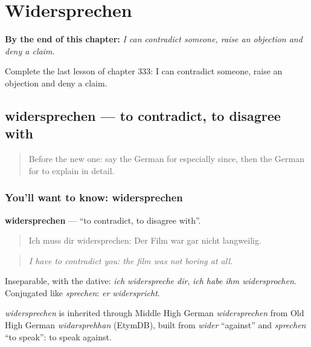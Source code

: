 
\chapter{Widersprechen}
\label{ch:ge-widersprechen}

\begin{chapteropening}
\textbf{By the end of this chapter:} \emph{I can contradict someone, raise an objection and deny a claim.}

Complete the last lesson of chapter 333: I can contradict someone, raise an objection and deny a claim.
\end{chapteropening}

\section[widersprechen]{widersprechen — to contradict, to disagree with}

\label{lesson:GE-C333-widersprechen}



\begin{quote}
Before the new one: say the German for especially since, then the German for to explain in detail.
\end{quote}

\subsection*{You'll want to know: widersprechen}
\textbf{widersprechen} — \textquotedblleft{}to contradict, to disagree with\textquotedblright{}.

\begin{quote}
Ich muss dir widersprechen: Der Film war gar nicht langweilig.
\end{quote}

\begin{quote}
\emph{I have to contradict you: the film was not boring at all.}
\end{quote}

Inseparable, with the dative: \emph{ich widerspreche dir}, \emph{ich habe ihm widersprochen}. Conjugated like \emph{sprechen}: \emph{er widerspricht}.

\begin{cousinweb}
\emph{widersprechen} is inherited through Middle High German \emph{widersprechen} from Old High German \emph{widarsprehhan} (EtymDB), built from \emph{wider} \textquotedblleft{}against\textquotedblright{} and \emph{sprechen} \textquotedblleft{}to speak\textquotedblright{}: to speak against.
\end{cousinweb}

